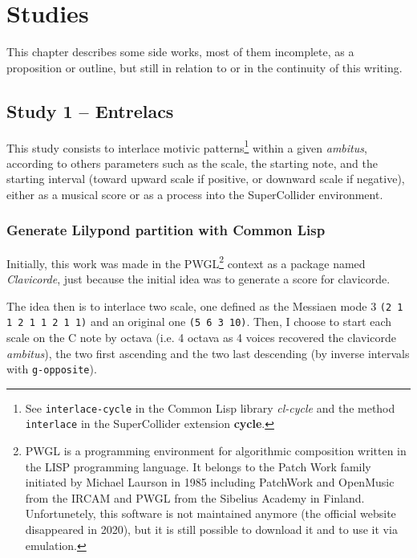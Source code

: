 \chapter*{Studies}


This chapter describes some side works, most of them incomplete, as a proposition or outline, but still in relation to or in the continuity of this writing.

\section*{Study 1 -- Entrelacs}


This study consists to interlace motivic patterns\footnote{See \texttt{interlace-cycle} in the Common Lisp library \textit{cl-cycle} and the method \texttt{interlace} in the SuperCollider extension \textbf{cycle}.} within a given \textit{ambitus}, according to others parameters such as the scale, the starting note, and the starting interval (toward upward scale if positive, or downward scale if negative), either as a musical score or as a process into the SuperCollider environment.


\subsection*{Generate Lilypond partition with Common Lisp}

Initially, this work was made in the PWGL\footnote{PWGL is a programming environment for algorithmic composition written in the LISP programming language. It belongs to the Patch Work family initiated by Michael Laurson in 1985 including PatchWork and OpenMusic from the IRCAM and PWGL from the Sibelius Academy in Finland. Unfortunetely, this software is not maintained anymore (the official website disappeared in 2020), but it is still possible to download it and to use it via emulation.} context as a package named \textit{Clavicorde}, just because the initial idea was to generate a score for clavicorde.

The idea then is to interlace two scale, one defined as the Messiaen mode 3 \texttt{(2 1 1 2 1 1 2 1 1)} and an original one \texttt{(5 6 3 10)}. Then, I choose to start each scale on the C note by octava (i.e. 4 octava as 4 voices recovered the clavicorde \textit{ambitus}), the two first ascending and the two last descending (by inverse intervals with \texttt{g-opposite}). 

